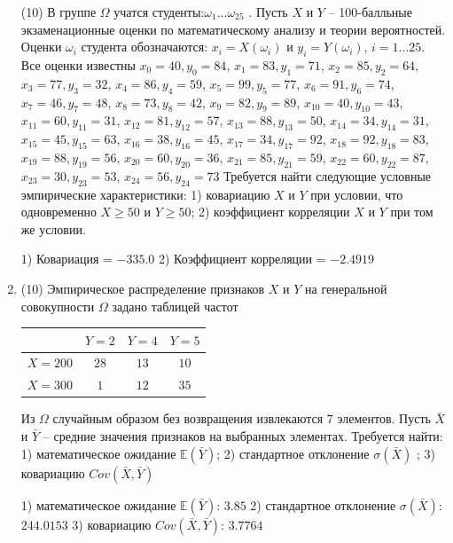 \documentclass[a4paper,14pt]{article}
\begin{document}
\begin{enumerate}
(10) В группе $\Omega$ учатся студенты:$\omega _{1}...\omega _{25}$ . Пусть $X$ и $Y$ – 100-балльные экзаменационные оценки по
математическому анализу и теории вероятностей. Оценки $\omega _{i}$ студента обозначаются: $x _{i} = X(\omega _{i})$ и $y _{i} = Y(\omega _{i})$, $i = 1...25$. Все оценки известны
$x _{0} = 40, y _{0} = 84$, $x _{1} = 83, y _{1} = 71$, $x _{2} = 85, y _{2} = 64$, $x _{3} = 77, y _{3} = 32$, $x _{4} = 86, y _{4} = 59$, $x _{5} = 99, y _{5} = 77$, $x _{6} = 91, y _{6} = 74$, $x _{7} = 46, y _{7} = 48$, $x _{8} = 73, y _{8} = 42$, $x _{9} = 82, y _{9} = 89$, $x _{10} = 40, y _{10} = 43$, $x _{11} = 60, y _{11} = 31$, $x _{12} = 81, y _{12} = 57$, $x _{13} = 88, y _{13} = 50$, $x _{14} = 34, y _{14} = 31$, $x _{15} = 45, y _{15} = 63$, $x _{16} = 38, y _{16} = 45$, $x _{17} = 34, y _{17} = 92$, $x _{18} = 92, y _{18} = 83$, $x _{19} = 88, y _{19} = 56$, $x _{20} = 60, y _{20} = 36$, $x _{21} = 85, y _{21} = 59$, $x _{22} = 60, y _{22} = 87$, $x _{23} = 30, y _{23} = 53$, $x _{24} = 56, y _{24} = 73$
Требуется
найти следующие условные эмпирические характеристики: 1) ковариацию $X$ и $Y$ при условии, что одновременно $X \geqslant 50$
 и $Y \geqslant 50$; 2) коэффициент корреляции $X$ и $Y$ при том же условии.




1) Ковариация = $-335.0$
2) Коэффициент корреляции = $-2.4919$


\item


(10) Эмпирическое распределение признаков $X$ и $Y$ на генеральной совокупности $\Omega$ задано таблицей частот  
 
\begin{tabular}{ | c | c | c | c | }
\hline
 & $Y = 2$ & $Y = 4$ & $Y = 5$  \\ \hline
$X = 200$ & $28$ & $13$ & $10$\\ \hline
$X = 300$ & $1$ & $12$ & $35$\\
\hline
\end{tabular}

Из $\Omega$ случайным образом без возвращения извлекаются $7$ элементов. 
Пусть $\bar X$ и $\bar Y$ – средние значения признаков на выбранных элементах. 
Требуется найти: 1) математическое ожидание $\mathbb{E}(\bar Y)$; 2) стандартное отклонение $\sigma(\bar X)$ ; 
3) ковариацию $Cov(\bar X, \bar Y)$




1) математическое ожидание $\mathbb{E}(\bar Y)$: $3.85$ 
2) стандартное отклонение $\sigma(\bar X)$: $244.0153$
3) ковариацию $Cov(\bar X, \bar Y)$: $3.7764$



\end{enumerate}
\end{document}
